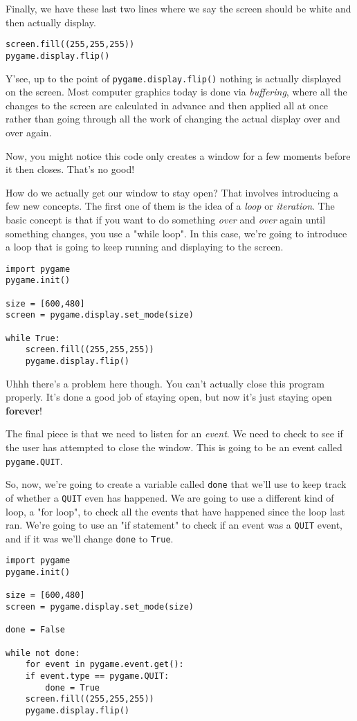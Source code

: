 \documentclass[11pt]{article}
\begin{document}
Finally, we have these last two lines where we say the screen should be white and then actually display.
\begin{verbatim}
screen.fill((255,255,255))
pygame.display.flip()
\end{verbatim}
Y'see, up to the point of \texttt{pygame.display.flip()} nothing is actually displayed on the screen. Most computer graphics today is done via \emph{buffering}, where all the changes to the screen are calculated in advance and then applied all at once rather than going through all the work of changing the actual display over and over again.

Now, you might notice this code only creates a window for a few moments before it then closes. That's no good!

How do we actually get our window to stay open? That involves introducing a few new concepts. The first one of them is the idea of a \emph{loop} or \emph{iteration}. The basic concept is that if you want to do something \emph{over} and \emph{over} again until something changes, you use a "while loop". In this case, we're going to introduce a loop that is going to keep running and displaying to the screen.

\begin{verbatim}
import pygame
pygame.init()

size = [600,480]
screen = pygame.display.set_mode(size)

while True:
    screen.fill((255,255,255))
    pygame.display.flip()
\end{verbatim}

Uhhh there's a problem here though. You can't actually close this program properly. It's done a good job of staying open, but now it's just staying open \textbf{forever}!

The final piece is that we need to listen for an \emph{event}. We need to check to see if the user has attempted to close the window. This is going to be an event called \texttt{pygame.QUIT}. 

So, now, we're going to create a variable called \texttt{done} that we'll use to keep track of whether a \texttt{QUIT} even has happened. We are going to use a different kind of loop, a "for loop", to check all the events that have happened since the loop last ran. We're going to use an "if statement" to check if an event was a \texttt{QUIT} event, and if it was we'll change \texttt{done} to \texttt{True}.

\begin{verbatim}
import pygame
pygame.init()

size = [600,480]
screen = pygame.display.set_mode(size)

done = False

while not done:
    for event in pygame.event.get():
	if event.type == pygame.QUIT:
	    done = True
    screen.fill((255,255,255))
    pygame.display.flip()
\end{verbatim}
\end{document}
